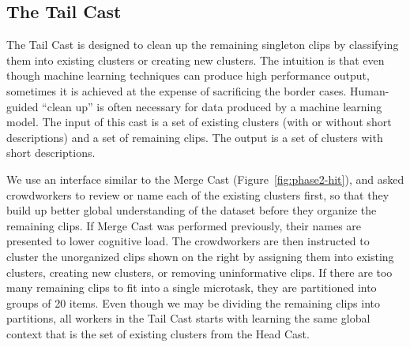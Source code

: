 \subsection{The Tail Cast}

The Tail Cast is designed to clean up the remaining singleton clips by classifying
them into existing clusters or creating new clusters.  The intuition is that
even though machine learning techniques can produce high performance output,
sometimes it is achieved at the expense of sacrificing the border cases.
Human-guided ``clean up'' is often necessary for data produced by a machine
learning model.  The input of this cast is a set of existing clusters
(with or without short descriptions) and a set of remaining clips. The
output is a set of clusters with short descriptions.

We use an interface similar to the Merge Cast (Figure~\ref{fig:phase2-hit}),
and asked crowdworkers to review or name each of the existing clusters first,
so that they build up better global understanding of the dataset before they
organize the remaining clips. If Merge Cast was performed previously, their
names are presented to lower cognitive load.  The crowdworkers are then
instructed to cluster the unorganized clips shown on the right by assigning
them into existing clusters, creating new clusters, or removing uninformative
clips.  If there are too many remaining clips to fit into a single microtask,
they are partitioned into groups of 20 items.  Even though we may be dividing
the remaining clips into partitions, all workers in the Tail Cast starts with
learning the same global context that is the set of existing clusters from the
Head Cast.





